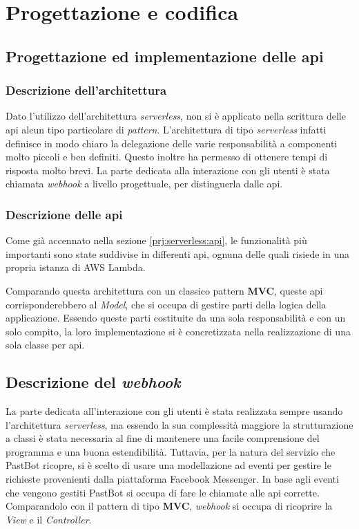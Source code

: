 
%
%

\chapter{Progettazione e codifica}

\section{Progettazione ed implementazione delle \gls{api}}

\subsection{Descrizione dell'architettura}

Dato l'utilizzo dell'architettura \textit{serverless}, non si è applicato nella
scrittura delle \gls{api} alcun tipo particolare di \textit{pattern}.
L'architettura di tipo \textit{serverless} infatti definisce in modo chiaro la
delegazione delle varie responsabilità a componenti molto piccoli e ben
definiti. Questo inoltre ha permesso di ottenere tempi di risposta molto brevi.
La parte dedicata alla interazione con gli utenti è stata chiamata
\textit{webhook} a livello progettuale, per distinguerla dalle \gls{api}.

\subsection{Descrizione delle \gls{api}}
Come già accennato nella sezione \ref{prj:serverless:api}, le funzionalità più
importanti sono state suddivise in differenti \gls{api}, ognuna delle quali
risiede in una propria istanza di AWS Lambda.

Comparando questa architettura con un classico pattern \textbf{MVC}, queste
\gls{api} corrisponderebbero al \textit{Model}, che si occupa di gestire parti
della logica della applicazione. Essendo queste parti costituite da una sola
responsabilità e con un solo compito, la loro implementazione si è
concretizzata nella realizzazione di una sola classe per \gls{api}.

\section{Descrizione del \textit{webhook}}
La parte dedicata all'interazione con gli utenti è stata realizzata sempre
usando l'architettura \textit{serverless}, ma essendo la sua complessità
maggiore la strutturazione a classi è stata necessaria al fine di mantenere una
facile comprensione del programma e una buona estendibilità. Tuttavia, per la
natura del servizio che PastBot ricopre, si è scelto di usare una modellazione
ad eventi per gestire le richieste provenienti dalla piattaforma Facebook
Messenger. In base agli eventi che vengono gestiti PastBot si occupa di fare le
chiamate alle \gls{api} corrette. Comparandolo con il pattern di tipo
\textbf{MVC}, \textit{webhook} si occupa di ricoprire la \textit{View} e il
\textit{Controller}.

